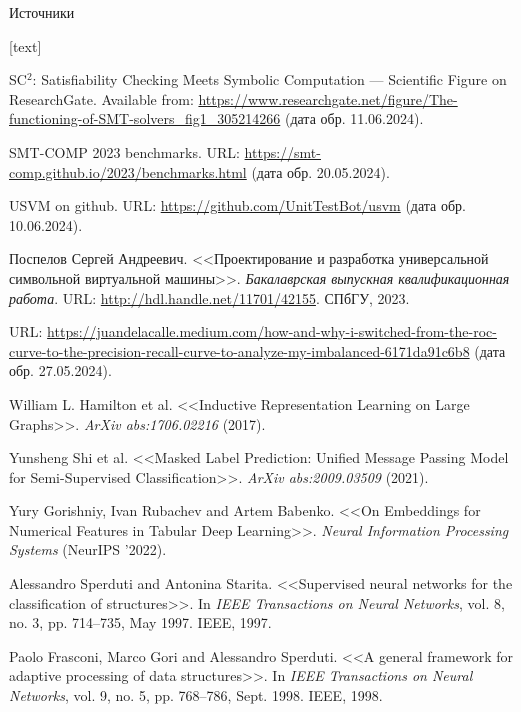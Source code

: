 \documentclass[14pt,aspectratio=169,hyperref={pdftex,unicode},xcolor=dvipsnames]{beamer}
\begin{document}
\begin{frame}{Источники}

\begin{thebibliography}{1}

[text]

 SC$^{\text{2}}$: Satisfiability Checking Meets Symbolic Computation --- Scientific Figure on ResearchGate. Available from: \url{https://www.researchgate.net/figure/The-functioning-of-SMT-solvers_fig1_305214266} (дата обр. 11.06.2024).

 SMT-COMP 2023 benchmarks. URL: \url{https://smt-comp.github.io/2023/benchmarks.html} (дата обр. 20.05.2024).

 USVM on github. URL: \url{https://github.com/UnitTestBot/usvm} (дата обр. 10.06.2024).

 Поспелов Сергей Андреевич. <<Проектирование и разработка универсальной символьной виртуальной машины>>. \textit{Бакалаврская выпускная квалификационная работа}. URL: \url{http://hdl.handle.net/11701/42155}. СПбГУ, 2023.

 URL: \url{https://juandelacalle.medium.com/how-and-why-i-switched-from-the-roc-curve-to-the-precision-recall-curve-to-analyze-my-imbalanced-6171da91c6b8} (дата обр. 27.05.2024).

 William L. Hamilton et al. <<Inductive Representation Learning on Large Graphs>>.  \textit{ArXiv abs:1706.02216} (2017).

 Yunsheng Shi et al. <<Masked Label Prediction: Unified Message Passing Model for Semi-Supervised Classification>>. \textit{ArXiv abs:2009.03509} (2021).

 Yury Gorishniy, Ivan Rubachev and Artem Babenko. <<On Embeddings for Numerical Features in Tabular Deep Learning>>. \textit{Neural Information Processing Systems} (NeurIPS '2022).

 Alessandro Sperduti and Antonina Starita. <<Supervised neural networks for the classification of structures>>. In \textit{IEEE Transactions on Neural Networks}, vol. 8, no. 3, pp. 714--735, May 1997. IEEE, 1997.

 Paolo Frasconi, Marco Gori and Alessandro Sperduti. <<A general framework for adaptive processing of data structures>>. In \textit{IEEE Transactions on Neural Networks}, vol. 9, no. 5, pp. 768--786, Sept. 1998. IEEE, 1998.


\end{thebibliography}
\end{frame}
\end{document}
